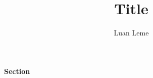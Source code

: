 \documentclass[11pt, a4paper]{article}
\title{Title}
\author{Luan Leme}
\begin{document}
\maketitle

\paragraph{Section}
\end{document}
